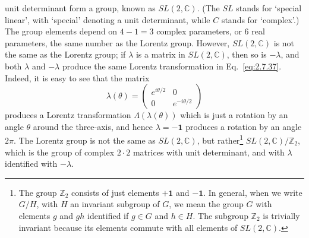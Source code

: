 unit determinant form a group, known as $SL(2,\mathbb{C})$. (The $SL$ stands for
`special linear', with `special' denoting a unit determinant, while $C$ stands
for `complex'.) The group elements depend on $4-1=3$ complex parameters, or 6
real parameters, the same number as the Lorentz group. However, $SL(2,\mathbb{C})$ is
not the same as the Lorentz group; if $\lambda$ is a matrix in $SL(2,\mathbb{C})$, then
so is $-\lambda$, and both $\lambda$ and $-\lambda$ produce the same Lorentz
transformation in Eq.~\eqref{eq:2.7.37}. Indeed, it is easy to see that the matrix
\begin{equation*}
  \lambda(\theta)=
  \begin{pmatrix}
    e^{i\theta/2} & 0\\
    0 & e^{-i\theta/2}
  \end{pmatrix}
\end{equation*}
produces a Lorentz transformation $\Lambda(\lambda(\theta))$ which is just a
rotation by an angle $\theta$ around the three-axis, and hence
$\lambda=-\mathbf{1}$ produces a rotation by an angle $2\pi$. The Lorentz group
is not the same as $SL(2,\mathbb{C})$, but rather\footnote{The group $\mathbb{Z}_2$ consists of just
elements $+\mathbf{1}$ and $-\mathbf{1}$. In general, when we write $G/H$, with
$H$ an invariant subgroup of $G$, we mean the group $G$ with elements $g$ and
$gh$ identified if $g\in G$ and $h\in H$. The subgroup $\mathbb{Z}_2$ is trivially
invariant because its elements commute with all elements of $SL(2,\mathbb{C})$.}
$SL(2,\mathbb{C})/\mathbb{Z}_2$, which is the group of complex $2\cdot2$ matrices with unit
determinant, and with $\lambda$ identified with $-\lambda$.

